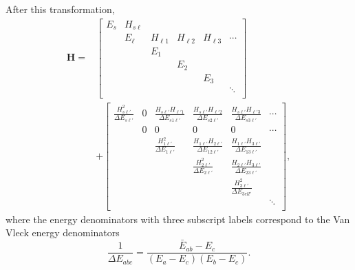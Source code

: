 After this transformation, 
\begin{equation}
  \begin{split}
    \mathbf{H} =&
    \begin{bmatrix}
    E_s & H_{s \ell} \\
    & E_\ell &  H_{\ell 1} & H_{\ell 2} & H_{\ell 3} & \dotsm \\
    & & E_1 \\
    & & & E_2 \\
    & & & & E_3 \\
    & & & & & \ddots \\
    \end{bmatrix}\\
    & +
    \begin{bmatrix}
    \frac{H_{s \ell'}^2}{\Delta E_{s \ell'}} & 0 &
    \frac{H_{s \ell'}H_{\ell' 1}}{\Delta E_{s 1 \ell'}} &
    \frac{H_{s \ell'}H_{\ell' 2}}{\Delta E_{s 2 \ell'}} &
    \frac{H_{s \ell'}H_{\ell' 3}}{\Delta E_{s 3 \ell'}} & \dotsm \\
    & 0 & 0 & 0 & 0 & \dotsm \\
    & & \frac{H_{1 \ell'}^2}{\Delta E_{1 \ell'}} & 
         \frac{H_{1 \ell'}H_{2 \ell'}}{\Delta E_{1 2 \ell'}} &
         \frac{H_{1 \ell'}H_{3 \ell'}}{\Delta E_{1 3 \ell'}} \\
    & & & \frac{H_{2 \ell'}^2}{\Delta E_{2 \ell'}} &
          \frac{ H_{2 \ell'}H_{3 \ell'}}{ \Delta E_{2 3 \ell'}} \\
    & & & & \frac{H_{3 \ell'}^2}{ \Delta E_{3 ell'}} \\
    & & & & & \ddots \\
    \end{bmatrix},
  \end{split}
\end{equation}
where the energy denominators with three subscript labels correspond
to the Van Vleck energy denominators
\begin{equation}
  \frac{1}{\Delta E_{a b c}} = 
  \frac{\bar{E}_{a b} - E_c}
  {(E_a - E_c)(E_b - E_c)}.
\end{equation}

